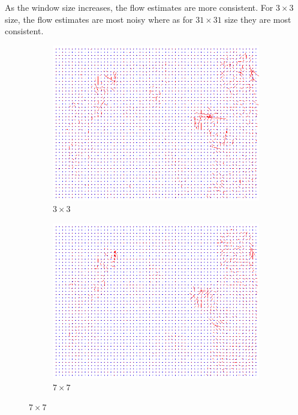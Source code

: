 \documentclass[a4paper,11]{article}
\begin{document}
As the window size increases, the flow estimates are more consistent. For $3\times3$ size, the flow estimates are most noisy where as for $31\times31$ size they are most consistent.

\begin{figure}[H]
  \begin{subfigure}{0.5\textwidth}
   \centering
   \includegraphics[width=0.8\linewidth]{Basketball/flow_3x3.png}
   \caption{$3 \times 3$}
  \end{subfigure}
  \begin{subfigure}{0.5\textwidth}
   \centering
   \includegraphics[width=0.8\linewidth]{Basketball/flow_7x7.png}
   \caption{$7 \times 7$}
  \end{subfigure}
  \end{figure}
\end{document}
